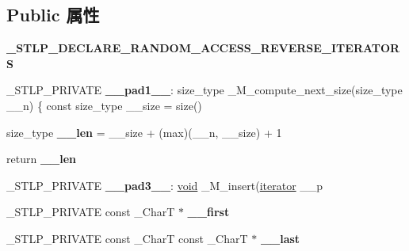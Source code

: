 \subsection*{Public 属性}
\begin{DoxyCompactItemize}
\item 
\mbox{\label{classbasic__string_a6e82e72a6a7839caccb1d6bcfc51c78e}} 
{\bfseries \+\_\+\+S\+T\+L\+P\+\_\+\+D\+E\+C\+L\+A\+R\+E\+\_\+\+R\+A\+N\+D\+O\+M\+\_\+\+A\+C\+C\+E\+S\+S\+\_\+\+R\+E\+V\+E\+R\+S\+E\+\_\+\+I\+T\+E\+R\+A\+T\+O\+RS}
\item 
\mbox{\label{classbasic__string_a5e0b15c2c55353df2385bc5e12b5e347}} 
\+\_\+\+S\+T\+L\+P\+\_\+\+P\+R\+I\+V\+A\+TE {\bfseries \+\_\+\+\_\+pad1\+\_\+\+\_\+}\+: size\+\_\+type \+\_\+\+M\+\_\+compute\+\_\+next\+\_\+size(size\+\_\+type \+\_\+\+\_\+n) \{ const size\+\_\+type \+\_\+\+\_\+size = size()
\item 
\mbox{\label{classbasic__string_a6a7eace114e6daa26b09093e7ded9ff5}} 
size\+\_\+type {\bfseries \+\_\+\+\_\+len} = \+\_\+\+\_\+size + (max)(\+\_\+\+\_\+n, \+\_\+\+\_\+size) + 1
\item 
\mbox{\label{classbasic__string_acb04ddaa22a1b2a92243307dcd022045}} 
return {\bfseries \+\_\+\+\_\+len}
\item 
\mbox{\label{classbasic__string_af6d0d1fa6bb78cda935670e7e25afd9e}} 
\+\_\+\+S\+T\+L\+P\+\_\+\+P\+R\+I\+V\+A\+TE {\bfseries \+\_\+\+\_\+pad3\+\_\+\+\_\+}\+: \hyperlink{interfacevoid}{void} \+\_\+\+M\+\_\+insert(\hyperlink{structiterator}{iterator} \+\_\+\+\_\+p
\item 
\mbox{\label{classbasic__string_ade84fd8bd2571dd3a6754ec8838cdc2f}} 
\+\_\+\+S\+T\+L\+P\+\_\+\+P\+R\+I\+V\+A\+TE const \+\_\+\+CharT $\ast$ {\bfseries \+\_\+\+\_\+first}
\item 
\mbox{\label{classbasic__string_ab98f57bde1debbe5d7e341e243cfc2dc}} 
\+\_\+\+S\+T\+L\+P\+\_\+\+P\+R\+I\+V\+A\+TE const \+\_\+\+CharT const \+\_\+\+CharT $\ast$ {\bfseries \+\_\+\+\_\+last}
\item 
\mbox{\label{classbasic__string_aeefd34ea286d151768df247f9023035b}} 

\end{DoxyCompactItemize}
